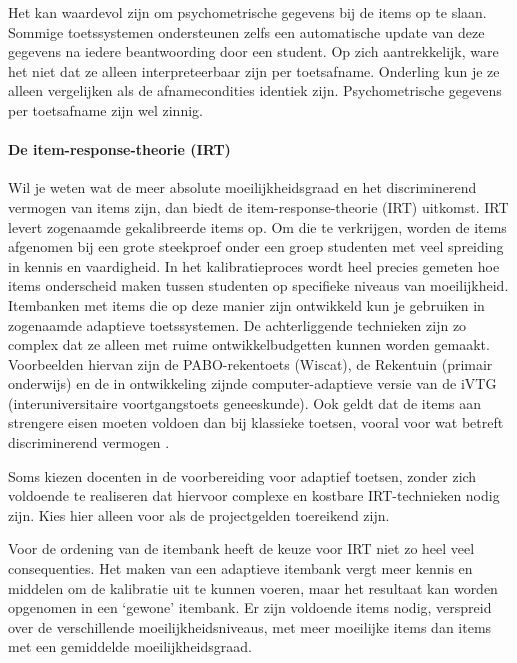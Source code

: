 \documentclass[
]{book}
\begin{document}
Het kan waardevol zijn om psychometrische gegevens bij de items op te slaan. Sommige toetssystemen ondersteunen zelfs een automatische update van deze gegevens na iedere beantwoording door een student. Op zich aantrekkelijk, ware het niet dat ze alleen interpreteerbaar zijn per toetsafname. Onderling kun je ze alleen vergelijken als de afnamecondities identiek zijn. Psychometrische gegevens per toetsafname zijn wel zinnig.

\hypertarget{de-item-response-theorie-irt}{%
\paragraph{De item-response-theorie (IRT)}\label{de-item-response-theorie-irt}}

Wil je weten wat de meer absolute moeilijkheidsgraad en het discriminerend vermogen van
items zijn, dan biedt de item-response-theorie (IRT) uitkomst. IRT levert zogenaamde gekalibreerde items op. Om die te verkrijgen, worden de items afgenomen bij een grote steekproef onder een groep studenten met veel spreiding in kennis en vaardigheid. In het kalibratieproces wordt heel precies gemeten hoe items onderscheid maken tussen studenten op specifieke niveaus van moeilijkheid. Itembanken met items die op deze manier zijn ontwikkeld kun je gebruiken in zogenaamde adaptieve toetssystemen. De achterliggende technieken zijn zo complex dat ze alleen met ruime ontwikkelbudgetten kunnen worden gemaakt. Voorbeelden hiervan zijn de PABO-rekentoets (Wiscat), de Rekentuin (primair onderwijs) en de in ontwikkeling zijnde computer-adaptieve versie van de iVTG (interuniversitaire voortgangstoets geneeskunde). Ook geldt dat de items aan strengere eisen moeten voldoen dan bij klassieke toetsen, vooral voor wat betreft discriminerend vermogen \citep{linden2000computerized}.

Soms kiezen docenten in de voorbereiding voor adaptief toetsen, zonder zich voldoende te realiseren dat hiervoor complexe en kostbare IRT-technieken nodig zijn. Kies hier alleen voor als de projectgelden toereikend zijn.

Voor de ordening van de itembank heeft de keuze voor IRT niet zo heel veel consequenties. Het maken van een adaptieve itembank vergt meer kennis en middelen om de kalibratie uit te kunnen voeren, maar het resultaat kan worden opgenomen in een `gewone' itembank. Er zijn voldoende items nodig, verspreid over de verschillende moeilijkheidsniveaus, met meer moeilijke items dan items met een gemiddelde moeilijkheidsgraad.
\end{document}
